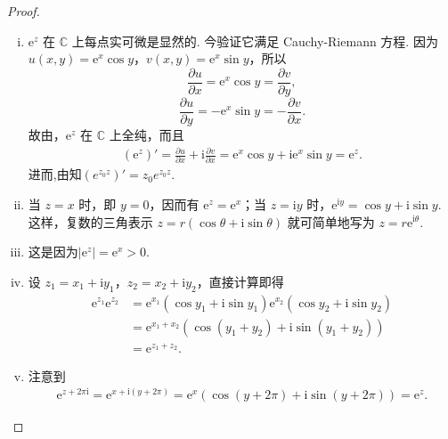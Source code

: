 \documentclass[../../main.tex]{subfiles}
\begin{document}
\begin{proof}
\begin{enumerate}[(i)]
\item \( \mathrm{e}^z \) 在 \( \mathbb{C} \) 上每点实可微是显然的. 今验证它满足 Cauchy-Riemann 方程. 因为 \( u(x, y) = \mathrm{e}^x \cos y \)，\( v(x, y) = \mathrm{e}^x \sin y \)，所以
\[
\frac{\partial u}{\partial x} = \mathrm{e}^x \cos y = \frac{\partial v}{\partial y},
\]
\[
\frac{\partial u}{\partial y} = -\mathrm{e}^x \sin y = -\frac{\partial v}{\partial x}.
\]
故由，\( \mathrm{e}^z \) 在 \( \mathbb{C} \) 上全纯，而且
\begin{align*}
(\mathrm{e}^z)' = \frac{\partial u}{\partial x} + \mathrm{i} \frac{\partial v}{\partial x}= \mathrm{e}^x \cos y + \mathrm{i} \mathrm{e}^x \sin y= \mathrm{e}^z.
\end{align*}
进而,由知$\left( e^{z_0z} \right) ' =z_0e^{z_0z}.$

\item 当 \( z = x \) 时，即 \( y = 0 \)，因而有 \( \mathrm{e}^z = \mathrm{e}^x \)；当 \( z = \mathrm{i}y \) 时，\( \mathrm{e}^{\mathrm{i}y} = \cos y + \mathrm{i}\sin y \). 这样，复数的三角表示 \( z = r(\cos\theta + \mathrm{i}\sin\theta) \) 就可简单地写为 \( z = r\mathrm{e}^{\mathrm{i}\theta} \).

\item 这是因为$|\mathrm{e}^z| = \mathrm{e}^x > 0.$

\item 设 \( z_1 = x_1 + \mathrm{i}y_1 \)，\( z_2 = x_2 + \mathrm{i}y_2 \)，直接计算即得
\begin{align*}
\mathrm{e}^{z_1} \mathrm{e}^{z_2} &= \mathrm{e}^{x_1} (\cos y_1 + \mathrm{i}\sin y_1) \mathrm{e}^{x_2} (\cos y_2 + \mathrm{i}\sin y_2)\\
&= \mathrm{e}^{x_1 + x_2} (\cos(y_1 + y_2) + \mathrm{i}\sin(y_1 + y_2))\\
&= \mathrm{e}^{z_1 + z_2}.
\end{align*}

\item 注意到
\begin{align*}
\mathrm{e}^{z + 2\pi\mathrm{i}} = \mathrm{e}^{x + \mathrm{i}(y + 2\pi)}= \mathrm{e}^x (\cos(y + 2\pi) + \mathrm{i}\sin(y + 2\pi))= \mathrm{e}^z.
\end{align*}
\end{enumerate}

\end{proof}
\end{document}
